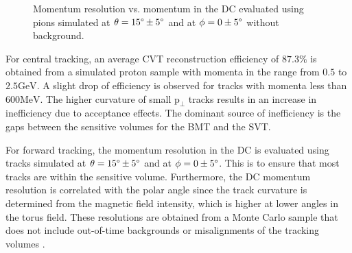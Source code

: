     \begin{figure}
        \centering{}
        \caption[DC momentum resolution vs momentum.]{Momentum resolution vs. momentum in the DC evaluated using pions simulated at $\theta = 15\degree \pm 5\degree$ and at $\phi = 0 \pm 5\degree$ without background.}
        \label{fig::dc_pres}
    \end{figure}

    For central tracking, an average CVT reconstruction efficiency of $87.3\%$ is obtained from a simulated proton sample with momenta in the range from $0.5$ to $2.5 \text{GeV}$.
    A slight drop of efficiency is observed for tracks with momenta less than $600 \text{MeV}$.
    The higher curvature of small $\text{p}_\perp$ tracks results in an increase in inefficiency due to acceptance effects.
    The dominant source of inefficiency is the gaps between the sensitive volumes for the BMT and the SVT.

    For forward tracking, the momentum resolution in the DC is evaluated using tracks simulated at $\theta = 15\degree \pm 5\degree$ and at $\phi = 0 \pm 5\degree$.
    This is to ensure that most tracks are within the sensitive volume.
    Furthermore, the DC momentum resolution is correlated with the polar angle since the track curvature is determined from the magnetic field intensity, which is higher at lower angles in the torus field.
    These resolutions are obtained from a Monte Carlo sample that does not include out-of-time backgrounds or misalignments of the tracking volumes \cite{ziegler2020}.

